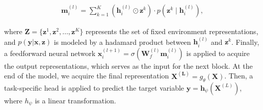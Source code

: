 \vspace{-3mm}
\begin{align}
\label{Eq: 6}
\mathbf{m}_i^{(l)}  = \sum_{k=1}^{K} (\mathbf{h}_i^{(l)} \odot \mathbf{z}^k) \cdot p(\mathbf{z}^k \mid \mathbf{h}_i^{(l)}), \tag{2}
\end{align}
\vspace{-3mm}

where \( \mathbf{Z} = \{ \mathbf{z}^1, \mathbf{z}^2, \ldots, \mathbf{z}^K \} \) represents the set of fixed environment representations, and \( p(\mathbf{y} | \mathbf{x}, \mathbf{z}) \) is modeled by a hadamard product between $\mathbf{h}_i^{(l)}$ and $\mathbf{z}^k$. Finally, a feedforward neural network \( \mathbf{x}_i^{(l+1)} = \sigma(\mathbf{W}_f^{(l)} \mathbf{m}_i^{(l)}) \) is applied to acquire the output representations, which serves as the input for the next block. At the end of the model, we acquire the final representation $\mathbf{X^{(L)}} = g_\theta(\mathbf{X})$. Then, a task-specific head is applied to predict the target variable $\mathbf{y}=\mathbf{h}_\psi(\mathbf{X}^{(L)})$, where $h_\psi$ is a linear transformation.









